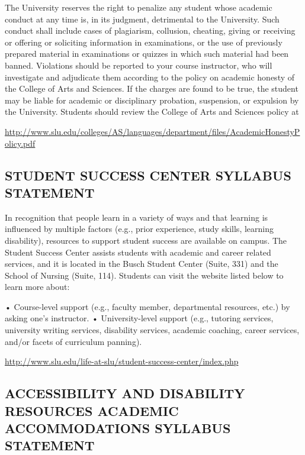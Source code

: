 \documentclass[11pt,]{article}
\begin{document}
The University reserves the right to penalize any student whose academic
conduct at any time is, in its judgment, detrimental to the University.
Such conduct shall include cases of plagiarism, collusion, cheating,
giving or receiving or offering or soliciting information in
examinations, or the use of previously prepared material in examinations
or quizzes in which such material had been banned. Violations should be
reported to your course instructor, who will investigate and adjudicate
them according to the policy on academic honesty of the College of Arts
and Sciences. If the charges are found to be true, the student may be
liable for academic or disciplinary probation, suspension, or expulsion
by the University. Students should review the College of Arts and
Sciences policy at

\url{http://www.slu.edu/colleges/AS/languages/department/files/AcademicHonestyPolicy.pdf}

\subsection{STUDENT SUCCESS CENTER SYLLABUS
STATEMENT}\label{student-success-center-syllabus-statement}

In recognition that people learn in a variety of ways and that learning
is influenced by multiple factors (e.g., prior experience, study skills,
learning disability), resources to support student success are available
on campus. The Student Success Center assists students with academic and
career related services, and it is located in the Busch Student Center
(Suite, 331) and the School of Nursing (Suite, 114). Students can visit
the website listed below to learn more about:

• Course-level support (e.g., faculty member, departmental resources,
etc.) by asking one's instructor. • University-level support (e.g.,
tutoring services, university writing services, disability services,
academic coaching, career services, and/or facets of curriculum
panning).

\url{http://www.slu.edu/life-at-slu/student-success-center/index.php}

\subsection{ACCESSIBILITY AND DISABILITY RESOURCES ACADEMIC
ACCOMMODATIONS SYLLABUS
STATEMENT}\label{accessibility-and-disability-resources-academic-accommodations-syllabus-statement}
\end{document}

